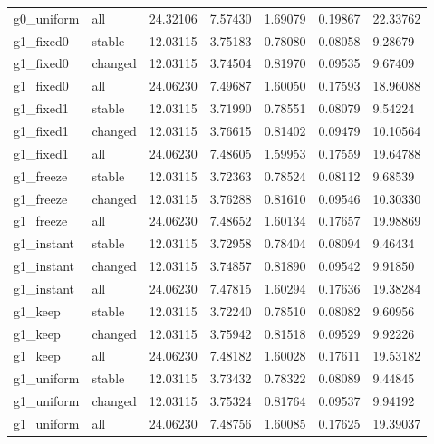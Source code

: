 \begin{longtable}{lllllll}
g0\_uniform & all & 24.32106 & 7.57430 & 1.69079 & 0.19867 & 22.33762 \\
g1\_fixed0 & stable & 12.03115 & 3.75183 & 0.78080 & 0.08058 & 9.28679 \\
g1\_fixed0 & changed & 12.03115 & 3.74504 & 0.81970 & 0.09535 & 9.67409 \\
g1\_fixed0 & all & 24.06230 & 7.49687 & 1.60050 & 0.17593 & 18.96088 \\
g1\_fixed1 & stable & 12.03115 & 3.71990 & 0.78551 & 0.08079 & 9.54224 \\
g1\_fixed1 & changed & 12.03115 & 3.76615 & 0.81402 & 0.09479 & 10.10564 \\
g1\_fixed1 & all & 24.06230 & 7.48605 & 1.59953 & 0.17559 & 19.64788 \\
g1\_freeze & stable & 12.03115 & 3.72363 & 0.78524 & 0.08112 & 9.68539 \\
g1\_freeze & changed & 12.03115 & 3.76288 & 0.81610 & 0.09546 & 10.30330 \\
g1\_freeze & all & 24.06230 & 7.48652 & 1.60134 & 0.17657 & 19.98869 \\
g1\_instant & stable & 12.03115 & 3.72958 & 0.78404 & 0.08094 & 9.46434 \\
g1\_instant & changed & 12.03115 & 3.74857 & 0.81890 & 0.09542 & 9.91850 \\
g1\_instant & all & 24.06230 & 7.47815 & 1.60294 & 0.17636 & 19.38284 \\
g1\_keep & stable & 12.03115 & 3.72240 & 0.78510 & 0.08082 & 9.60956 \\
g1\_keep & changed & 12.03115 & 3.75942 & 0.81518 & 0.09529 & 9.92226 \\
g1\_keep & all & 24.06230 & 7.48182 & 1.60028 & 0.17611 & 19.53182 \\
g1\_uniform & stable & 12.03115 & 3.73432 & 0.78322 & 0.08089 & 9.44845 \\
g1\_uniform & changed & 12.03115 & 3.75324 & 0.81764 & 0.09537 & 9.94192 \\
g1\_uniform & all & 24.06230 & 7.48756 & 1.60085 & 0.17625 & 19.39037 \\
\bottomrule
\end{longtable}
